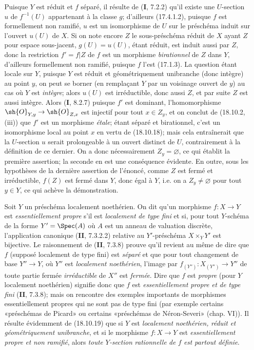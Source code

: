 Puisque $Y$ est réduit et $f$ séparé, il résulte de (\textbf{I}, 7.2.2) qu'il existe une $U$-section $u$ de $f^{-1}(U)$ appartenant à la classe $g$; d'ailleurs (17.4.1.2), puisque $f$ est formellement non ramifié, $u$ est un isomorphisme de $U$ sur le préschéma induit sur l'ouvert $u(U)$ de $X$. Si on note encore $Z$ le sous-préschéma réduit de $X$ ayant $Z$ pour espace sous-jacent, $g(U)=u(U)$, étant réduit, est induit aussi par $Z$, donc la restriction $f'=f|Z$ de $f$ est un morphisme \emph{birationnel} de $Z$ dans $Y$, d'ailleurs formellement non ramifié, puisque $f$ l'est (17.1.3). La question étant locale sur $Y$, puisque $Y$ est réduit et géométriquement unibranche (donc intègre) au point $y$, on peut se borner (en remplaçant $Y$ par un voisinage ouvert de $y$) au cas où $Y$ est \emph{intègre}; alors $u(U)$ est irréductible, donc aussi $Z$, et par suite $Z$ est aussi intègre. Alors (\textbf{I}, 8.2.7) puisque $f'$ est dominant, l'homomorphisme $\sh{O}_{Y,y}\to\sh{O}_{Z,x}$ est injectif pour tout $x\in Z_y$, et on conclut de (18.10.2, (iii)) que $f'$ est un morphisme \emph{étale}; étant séparé et birationnel, c'est un isomorphisme local au point $x$ en vertu de (18.10.18); mais cela entraînerait que la $U$-section $u$ serait prolongeable à un ouvert distinct de $U$, contrairement à la définition de ce dernier. On a donc nécessairement $Z_y=\varnothing$, ce qui établit la première assertion; la seconde en est une conséquence évidente. En outre, sous les hypothèses de la dernière assertion de l'énoncé, comme $Z$ est fermé et irréductible, $f(Z)$ est fermé dans $Y$, donc égal à $Y$, i.e. on a $Z_y\ne\varnothing$ pour tout $y\in Y$, ce qui achève la démonstration.

\begin{remark}[18.10.20]
Soit $Y$ un préschéma localement noethérien. On dit qu'un morphisme $f:X\to Y$ est \emph{essentiellement propre} s'il est \emph{localement de type fini} et si,
pour tout $Y$-schéma de la forme $Y'=\Spec(A)$ où $A$ est un anneau de valuation discrète, l'application canonique (\textbf{II}, 7.3.2.2) relative au $Y'$-préschéma $X\times_Y Y'$ est bijective.
Le raisonnement de (\textbf{II}, 7.3.8) prouve qu'il revient au même de dire que $f$ (supposé localement de type fini) est \emph{séparé} et que pour tout changement de base $Y''\to Y$, où $Y''$ est \emph{localement noethérien}, l'image par $f_{(Y'')}:X_{(Y'')}\to Y''$ de toute partie fermée \emph{irréductible} de $X''$ est \emph{fermée}. Dire que $f$ est \emph{propre} (pour $Y$ localement noethérien) signifie donc que $f$ est \emph{essentiellement propre et de type fini} (\textbf{II}, 7.3.8); mais on rencontre des exemples importants de morphismes essentiellement propres qui ne sont pas de type fini (par exemple certains «préschémas de Picard» ou certains «préschémas de Néron-Severi» (chap. VI)). Il résulte évidemment de (18.10.19) que si $Y$ est \emph{localement noethérien, réduit et géométriquement unibranche}, et si le morphisme $f:X\to Y$ est \emph{essentiellement propre et non ramifié}, alors \emph{toute $Y$-section rationnelle de $f$ est partout définie}.
\end{remark}


